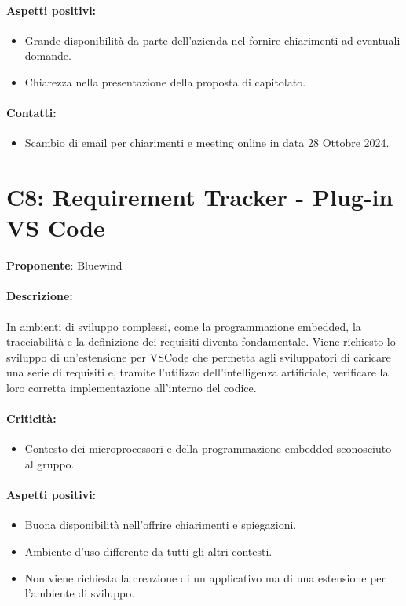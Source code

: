 \documentclass{TWDocumentFull}
\begin{document}
    \paragraph{Aspetti positivi:}
    \begin{itemize}
        \item Grande disponibilità da parte dell'azienda nel fornire chiarimenti ad eventuali domande.
        \item Chiarezza nella presentazione della proposta di capitolato.
    \end{itemize}
    \paragraph{Contatti:}
    \begin{itemize}
        \item Scambio di email per chiarimenti  e meeting online in data 28 Ottobre 2024.
    \end{itemize}

    \section*{C8: Requirement Tracker - Plug-in VS Code}
    {\textbf{Proponente}: Bluewind}
    \paragraph{Descrizione:\\}
    {In ambienti di sviluppo complessi, come la programmazione embedded, la tracciabilità e la definizione dei requisiti diventa fondamentale. Viene richiesto lo sviluppo di un'estensione per VSCode che permetta agli sviluppatori di caricare una serie di requisiti e, tramite l'utilizzo dell'intelligenza artificiale, verificare la loro corretta implementazione all'interno del codice.}
    \paragraph{Criticità:}
    \begin{itemize}
        \item Contesto dei microprocessori e della programmazione embedded sconosciuto al gruppo.
    \end{itemize}
    \paragraph{Aspetti positivi:}
    \begin{itemize}
        \item Buona disponibilità nell'offrire chiarimenti e spiegazioni.
        \item Ambiente d'uso differente da tutti gli altri contesti.
        \item Non viene richiesta la creazione di un applicativo ma di una estensione per l'ambiente di sviluppo.
    \end{itemize}
\end{document}
